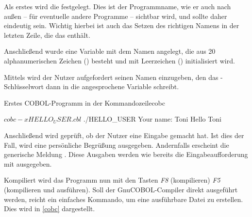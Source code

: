 Als erstes wird die  festgelegt. Dies ist der Programmname, wie er auch nach außen -- für eventuelle andere Programme -- sichtbar wird, und sollte daher eindeutig sein. Wichtig hierbei ist auch das Setzen des richtigen Namens in der letzten Zeile, die das  enthält.

Anschließend wurde eine Variable mit dem Namen  angelegt, die aus 20 alphanumerischen Zeichen () besteht und mit Leerzeichen () initialisiert wird.

Mittels  wird der Nutzer aufgefordert seinen Namen einzugeben, den das -Schlüsselwort dann in die angesprochene Variable schreibt.

\begin{codeWithCaption}{Erstes COBOL-Programm in der Kommandozeile}{cobc}
    \begin{shellwindow}
    $ cobc -x HELLO_USER.cbl
    $ ./HELLO_USER
    Your name: Toni
    Hello Toni
    \end{shellwindow}
\end{codeWithCaption}

Anschließend wird geprüft, ob der Nutzer eine Eingabe gemacht hat. Ist dies der Fall, wird eine persönliche Begrüßung ausgegeben. Andernfalls erscheint die generische Meldung . Diese Ausgaben werden wie bereits die Eingabeaufforderung mit  ausgegeben.

Kompiliert wird das Programm nun mit den Tasten \textit{F8} (kompilieren) \bzw \textit{F5} (kompilieren und ausführen). Soll der GnuCOBOL-Compiler direkt ausgeführt werden, reicht ein einfaches Kommando, um eine ausführbare Datei zu erstellen. Dies wird in \autoref{cobc} dargestellt.